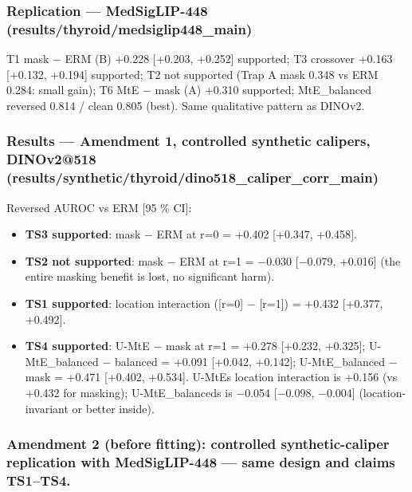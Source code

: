 {\subsubsection{Replication --- MedSigLIP-448 (results/thyroid/medsiglip448\_main)}\label{replication--medsiglip-448-resultsthyroidmedsiglip448_main}

T1 mask − ERM (B) +0.228 {[}+0.203, +0.252{]} supported; T3 crossover +0.163 {[}+0.132, +0.194{]} supported; T2 not
supported (Trap A mask 0.348 vs ERM 0.284: small gain); T6 MtE − mask (A) +0.310 supported; MtE\_balanced reversed
0.814 / clean 0.805 (best). Same qualitative pattern as DINOv2.

\subsubsection{Results --- Amendment 1, controlled synthetic calipers, DINOv2@518 (results/synthetic/thyroid/dino518\_caliper\_corr\_main)}\label{results--amendment-1-controlled-synthetic-calipers-dinov2518-resultssyntheticthyroiddino518_caliper_corr_main}

Reversed AUROC vs ERM {[}95 \% CI{]}:

\begin{itemize}

\item
  \textbf{TS3 supported}: mask − ERM at r=0 = +0.402 {[}+0.347, +0.458{]}.
\item
  \textbf{TS2 not supported}: mask − ERM at r=1 = −0.030 {[}−0.079, +0.016{]} (the entire masking benefit is lost, no
  significant harm).
\item
  \textbf{TS1 supported}: location interaction ({[}r=0{]} − {[}r=1{]}) = +0.432 {[}+0.377, +0.492{]}.
\item
  \textbf{TS4 supported}: U-MtE − mask at r=1 = +0.278 {[}+0.232, +0.325{]}; U-MtE\_balanced − balanced = +0.091
  {[}+0.042, +0.142{]}; U-MtE\_balanced − mask = +0.471 {[}+0.402, +0.534{]}. U-MtE\textquotesingle s location interaction is +0.156
  (vs +0.432 for masking); U-MtE\_balanced\textquotesingle s is −0.054 {[}−0.098, −0.004{]} (location-invariant or better inside).
\end{itemize}

\subsubsection{Amendment 2 (before fitting): controlled synthetic-caliper replication with MedSigLIP-448 --- same design and claims TS1--TS4.}\label{amendment-2-before-fitting-controlled-synthetic-caliper-replication-with-medsiglip-448--same-design-and-claims-ts1ts4}

}
